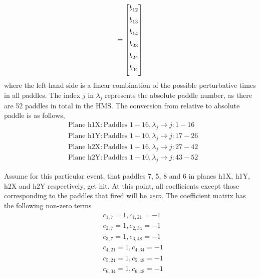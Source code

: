 \documentclass[14pt]{article}
\begin{document}
\begin{itemize}
\begin{align}
= \begin{bmatrix}
  \vspace{5px}
  b_{12}  \\
  \vspace{5px}
  b_{13}  \\
  \vspace{5px}
  b_{14}  \\
  \vspace{5px}
  b_{23}  \\
  \vspace{5px}
  b_{24}  \\
  \vspace{5px}
  b_{34}  \\
\end{bmatrix}
\end{align}
where the left-hand side is a linear combination of the possible perturbative times in all paddles. The index $j$ in $\lambda_{j}$
represents the absolute paddle number, as there are 52 paddles in total in the HMS. The conversion from relative to absolute paddle is as
follows,
\begin{align*}
  &\text{Plane h1X}: \text{Paddles } 1-16,  \lambda_{j}\rightarrow j:1-16 \\
  &\text{Plane h1Y}: \text{Paddles } 1-10,  \lambda_{j}\rightarrow j:17-26 \\
  &\text{Plane h2X}: \text{Paddles } 1-16,  \lambda_{j}\rightarrow j:27-42 \\
  &\text{Plane h2Y}: \text{Paddles } 1-10,  \lambda_{j}\rightarrow j:43-52 
\end{align*}

Assume for this particular event, that paddles
7, 5, 8 and 6 in planes h1X, h1Y, h2X and h2Y respectively, get hit. At this point, all coefficients except those corresponding to the paddles that
fired will be \textit{zero}. The coefficient matrix has the following non-zero terms
\begin{align*}
  &c_{1,7} = 1, c_{1, 21} = -1 \\
  &c_{2,7} = 1, c_{2, 34} = -1 \\
  &c_{3,7} = 1, c_{3, 48} = -1 \\
  &c_{4,21} = 1, c_{4,34} = -1 \\
  &c_{5,21} = 1, c_{5,48} = -1 \\
  &c_{6,34} = 1, c_{6,48} = -1
\end{align*}


\end{itemize}
\end{document}
